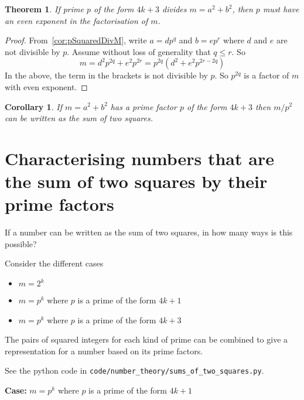 \documentclass[11pt]{amsart}
\newtheorem{theorem}{Theorem}[section]
\newtheorem{corollary}{Corollary}[section]
\begin{document}
\begin{theorem}
\label{thm:pIs4kPlus3EvenExponentInM}
If prime $p$ of the form $4k+3$ divides $m = a^{2} + b^{2}$, then $p$ must have an even exponent in the factorisation of $m$.
\end{theorem}

\begin{proof}
From~\cref{cor:pSquaredDivM}, write $a = d p^{q}$ and $b = e p^{r}$ where $d$ and $e$ are not divisible by $p$. Assume without loss of generality that $q \le r$.
So 
$$
m  = d^{2} p^{2q} + e^{2} p^{2r} = 
p^{2q} \left( d^{2} + e^{2} p^{2r-2q} \right)
$$
In the above, the term in the brackets is not divisible by $p$. So $p^{2q}$ is a factor of $m$ with even exponent.
\end{proof}


\begin{corollary}

If $m = a^2+b^2$ has a prime factor $p$ of the form $4k+3$ then $m/p^2$ can be written as the sum of two squares.

\end{corollary}

\section{Characterising numbers that are the sum of two squares by their prime factors}


If a number can be written as the sum of two squares, in how many ways is this possible?


Consider the different cases
\begin{itemize}
\item
$m = 2^{k}$
\item
$m = p^{k}$ where $p$ is a prime of the form $4k+1$
\item
$m = p^{k}$ where $p$ is a prime of the form $4k+3$
\end{itemize}

\vspace{1em}

The pairs of squared integers for each kind of prime can be combined to give a representation for a number based on its prime factors.

See the python code in \verb|code/number_theory/sums_of_two_squares.py|.


\vspace{2em}

\textbf{Case:} $m = p^{k}$ where $p$ is a prime of the form $4k+1$
\end{document}

